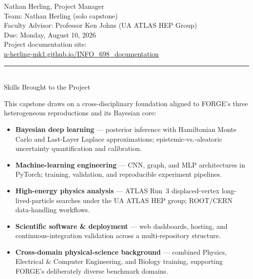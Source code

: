 \documentclass[11pt]{article}
\newcommand{\urllink}[2]{\href{#1}{\textcolor{urlblue}{\underline{#2}}}}
\begin{document}

\vspace{20pt}
\begin{center}
  {\Large Nathan Herling, Project Manager}\\[12pt]
  {\Large Team: Nathan Herling \textnormal{(solo capstone)}}\\[12pt]
  {\Large Faculty Advisor: Professor Ken Johns \textnormal{(UA ATLAS HEP Group)}}\\[12pt]
  {\Large Due: Monday, August 10, 2026}\\[14pt]
  {\normalsize Project documentation site:\\
   \urllink{https://n-herling-mk1.github.io/INFO_698_documentation/}%
           {n-herling-mk1.github.io/INFO\_698\_documentation}}
\end{center}

\vspace{18pt}

\begin{center}
  {\color{forgeamber}\rule{0.46\linewidth}{0.8pt}}\\[8pt]
  {\large\rmfamily\color{forgemute} Skills Brought to the Project}
\end{center}
\vspace{4pt}
{\small
This capstone draws on a cross-disciplinary foundation aligned to FORGE's three
heterogeneous reproductions and its Bayesian core:
\begin{itemize}\setlength{\itemsep}{1pt}\setlength{\parskip}{0pt}
  \item \textbf{Bayesian deep learning} --- posterior inference with Hamiltonian
        Monte Carlo and Last-Layer Laplace approximations; epistemic-vs.-aleatoric
        uncertainty quantification and calibration.
  \item \textbf{Machine-learning engineering} --- CNN, graph,
        and MLP architectures in PyTorch; training, validation, and reproducible
        experiment pipelines.
  \item \textbf{High-energy physics analysis} --- ATLAS Run~3 displaced-vertex
        long-lived-particle searches under the UA ATLAS HEP group; ROOT/CERN
        data-handling workflows.
  \item \textbf{Scientific software \& deployment} --- web dashboards, hosting, and
        continuous-integration validation across a multi-repository structure.
  \item \textbf{Cross-domain physical-science background} --- combined Physics,
        Electrical \& Computer Engineering, and Biology training, supporting
        FORGE's deliberately diverse benchmark domains.
\end{itemize}}
\end{document}
